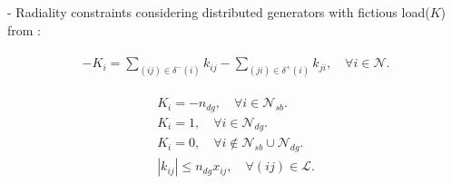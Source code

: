 \documentclass{article}
\begin{document}
- Radiality constraints considering distributed generators with fictious load($K$) from \cite{5982115}:
{\allowdisplaybreaks
\begin{align}
  \begin{split}
    -K_{i} = \sum_{(ij) \in \delta^{-}(i)} k_{ij} - \sum_{(ji) \in \delta^{+}(i)} k_{ji}, 
    \quad \forall i \in \mathcal{N}.
  \end{split}
\end{align}

\begin{align}
    K_{i} = -n_{dg}, \quad \forall i \in \mathcal{N}_{sb}. \\
    K_{i} = 1, \quad \forall i \in \mathcal{N}_{dg}. \\
    K_{i} = 0, \quad \forall i \notin \mathcal{N}_{sb} \cup \mathcal{N}_{dg}. \\
    |k_{ij}| \leq n_{dg} x_{ij}, \quad \forall (ij) \in \mathcal{L}. 
\end{align}
}


 

\end{document}
